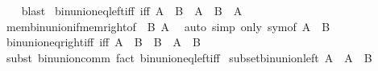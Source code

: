 \begin{isabellebody}
%
\isadelimproof
\ \ %
\endisadelimproof
%
\isatagproof
{}\isamarkupfalse%
\ blast%
\endisatagproof
{\isafoldproof}%
%
\isadelimproof
\isanewline
%
\endisadelimproof
\isanewline
{}\isamarkupfalse%
\ bin{\isacharunderscore}{\kern0pt}union{\isacharunderscore}{\kern0pt}eq{\isacharunderscore}{\kern0pt}left{\isacharunderscore}{\kern0pt}iff\ {\isacharbrackleft}{\kern0pt}iff{\isacharbrackright}{\kern0pt}{\isacharcolon}{\kern0pt}\ {\isachardoublequoteopen}A\ {\isasymunion}\ B\ {\isacharequal}{\kern0pt}\ A\ {\isasymlongleftrightarrow}\ B\ {\isasymsubseteq}\ A{\isachardoublequoteclose}\isanewline
%
\isadelimproof
\ \ %
\endisadelimproof
%
\isatagproof
{}\isamarkupfalse%
\ mem{\isacharunderscore}{\kern0pt}bin{\isacharunderscore}{\kern0pt}union{\isacharunderscore}{\kern0pt}if{\isacharunderscore}{\kern0pt}mem{\isacharunderscore}{\kern0pt}right{\isacharbrackleft}{\kern0pt}of\ {\isacharunderscore}{\kern0pt}\ B\ A{\isacharbrackright}{\kern0pt}\ \isamarkupfalse%
\ {\isacharparenleft}{\kern0pt}auto\ simp\ only{\isacharcolon}{\kern0pt}\ sym{\isacharbrackleft}{\kern0pt}of\ {\isachardoublequoteopen}A\ {\isasymunion}\ B{\isachardoublequoteclose}{\isacharbrackright}{\kern0pt}{\isacharparenright}{\kern0pt}%
\endisatagproof
{\isafoldproof}%
%
\isadelimproof
\isanewline
%
\endisadelimproof
\isanewline
{}\isamarkupfalse%
\ bin{\isacharunderscore}{\kern0pt}union{\isacharunderscore}{\kern0pt}eq{\isacharunderscore}{\kern0pt}right{\isacharunderscore}{\kern0pt}iff\ {\isacharbrackleft}{\kern0pt}iff{\isacharbrackright}{\kern0pt}{\isacharcolon}{\kern0pt}\ {\isachardoublequoteopen}A\ {\isasymunion}\ B\ {\isacharequal}{\kern0pt}\ B\ {\isasymlongleftrightarrow}\ A\ {\isasymsubseteq}\ B{\isachardoublequoteclose}\isanewline
%
\isadelimproof
\ \ %
\endisadelimproof
%
\isatagproof
{}\isamarkupfalse%
\ {\isacharparenleft}{\kern0pt}subst\ bin{\isacharunderscore}{\kern0pt}union{\isacharunderscore}{\kern0pt}comm{\isacharparenright}{\kern0pt}\ {\isacharparenleft}{\kern0pt}fact\ bin{\isacharunderscore}{\kern0pt}union{\isacharunderscore}{\kern0pt}eq{\isacharunderscore}{\kern0pt}left{\isacharunderscore}{\kern0pt}iff{\isacharparenright}{\kern0pt}%
\endisatagproof
{\isafoldproof}%
%
\isadelimproof
\isanewline
%
\endisadelimproof
\isanewline
{}\isamarkupfalse%
\ subset{\isacharunderscore}{\kern0pt}bin{\isacharunderscore}{\kern0pt}union{\isacharunderscore}{\kern0pt}left{\isacharcolon}{\kern0pt}\ {\isachardoublequoteopen}A\ {\isasymsubseteq}\ A\ {\isasymunion}\ B{\isachardoublequoteclose}%
\isadelimproof

\end{isabellebody}
